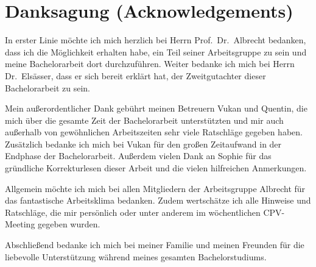 \chapter*{Danksagung (Acknowledgements)}

In erster Linie möchte ich mich herzlich bei Herrn Prof.~Dr.~Albrecht bedanken, dass ich die Möglichkeit erhalten habe, ein Teil seiner Arbeitsgruppe zu sein und meine Bachelorarbeit dort durchzuführen.
Weiter bedanke ich mich bei Herrn Dr.~Elsässer, dass er sich bereit erklärt hat, der Zweitgutachter dieser Bachelorarbeit zu sein.

Mein außerordentlicher Dank gebührt meinen Betreuern Vukan und Quentin, die mich über die gesamte Zeit der Bachelorarbeit unterstützten und mir auch außerhalb von gewöhnlichen Arbeitszeiten sehr viele Ratschläge gegeben haben.
Zusätzlich bedanke ich mich bei Vukan für den großen Zeitaufwand in der Endphase der Bachelorarbeit.
Außerdem vielen Dank an Sophie für das gründliche Korrekturlesen dieser Arbeit und die vielen hilfreichen Anmerkungen.

Allgemein möchte ich mich bei allen Mitgliedern der Arbeitsgruppe Albrecht für das fantastische Arbeitsklima bedanken. 
Zudem wertschätze ich alle Hinweise und Ratschläge, die mir persönlich oder unter anderem im wöchentlichen CPV-Meeting gegeben wurden.

Abschließend bedanke ich mich bei meiner Familie und meinen Freunden für die liebevolle Unterstützung während meines gesamten Bachelorstudiums.
